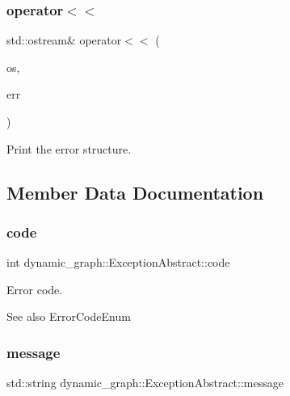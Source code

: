 \subsubsection{\texorpdfstring{operator$<$$<$}{operator<<}}
{\footnotesize\ttfamily std\+::ostream\& operator$<$$<$ (\begin{DoxyParamCaption}\item[{std\+::ostream \&}]{os,  }\item[{const \hyperlink{classdynamic__graph_1_1ExceptionAbstract}{Exception\+Abstract} \&}]{err }\end{DoxyParamCaption})\hspace{0.3cm}{\ttfamily [friend]}}



Print the error structure. 



\subsection{Member Data Documentation}
\mbox{\label{classdynamic__graph_1_1ExceptionAbstract_a160cf3cd35aad75738f8b26c5cec6fdc}} 
\subsubsection{\texorpdfstring{code}{code}}
{\footnotesize\ttfamily int dynamic\+\_\+graph\+::\+Exception\+Abstract\+::code\hspace{0.3cm}{\ttfamily [protected]}}



Error code. 

\begin{DoxySeeAlso}{See also}
Error\+Code\+Enum 
\end{DoxySeeAlso}
\mbox{\label{classdynamic__graph_1_1ExceptionAbstract_a9622b93d152c08ab80ed4b48ea24380b}} 
\subsubsection{\texorpdfstring{message}{message}}
{\footnotesize\ttfamily std\+::string dynamic\+\_\+graph\+::\+Exception\+Abstract\+::message\hspace{0.3cm}{\ttfamily [protected]}}



